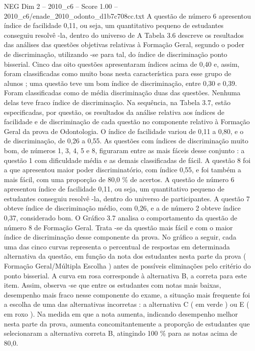 \begin{textsample}{NEG Dim 2 – 2010\_c6 – Score 1.00 – 2010\_c6/enade\_2010\_odonto\_d1b7c708cc.txt}
A questão de número 6 apresentou índice de facilidade 0,11, ou seja, um quantitativo pequeno de estudantes conseguiu resolvê -la, dentro do universo de A Tabela 3.6 descreve os resultados das análises das questões objetivas relativas à Formação Geral, segundo o poder de discriminação, utilizando -se para tal, do índice de discriminação ponto bisserial.
Cinco das oito questões apresentaram índices acima de 0,40 e, assim, foram classificadas como muito boas nesta característica para esse grupo de alunos ; uma questão teve um bom índice de discriminação, entre 0,30 e 0,39.
Foram classificadas como de média discriminação duas das questões.
Nenhuma delas teve fraco índice de discriminação.
Na sequência, na Tabela 3.7, estão especificadas, por questão, os resultados da análise relativa aos índices de facilidade e de discriminação de cada questão no componente relativo à Formação Geral da prova de Odontologia.
O índice de facilidade variou de 0,11 a 0,80, e o de discriminação, de 0,26 a 0,55.
As questões com índices de discriminação muito bom, de números 1, 3, 4, 5 e 8, figuraram entre as mais fáceis desse conjunto : a questão 1 com dificuldade média e as demais classificadas de fácil.
A questão 8 foi a que apresentou maior poder discriminatório, com índice 0,55, e foi também a mais fácil, com uma proporção de 80,0 \% de acertos.
A questão de número 6 apresentou índice de facilidade 0,11, ou seja, um quantitativo pequeno de estudantes conseguiu resolvê -la, dentro do universo de participantes.
A questão 7 obteve índice de discriminação médio, com 0,26, e a de número 2 obteve índice 0,37, considerado bom.
O Gráfico 3.7 analisa o comportamento da questão de número 8 de Formação Geral.
Trata -se da questão mais fácil e com o maior índice de discriminação desse componente da prova.
No gráfico a seguir, cada uma das cinco curvas representa o percentual de respostas em determinada alternativa da questão, em função da nota dos estudantes nesta parte da prova ( Formação Geral/Múltipla Escolha ) antes de possíveis eliminações pelo critério do ponto bisserial.
A curva em rosa corresponde à alternativa B, a correta para este item.
Assim, observa -se que entre os estudantes com notas mais baixas, desempenho mais fraco nesse componente do exame, a situação mais frequente foi a escolha de uma das alternativas incorretas : a alternativa C ( em verde ) ou E ( em roxo ).
Na medida em que a nota aumenta, indicando desempenho melhor nesta parte da prova, aumenta concomitantemente a proporção de estudantes que selecionaram a alternativa correta B, atingindo 100 \% para as notas acima de 80,0.

\end{textsample}
